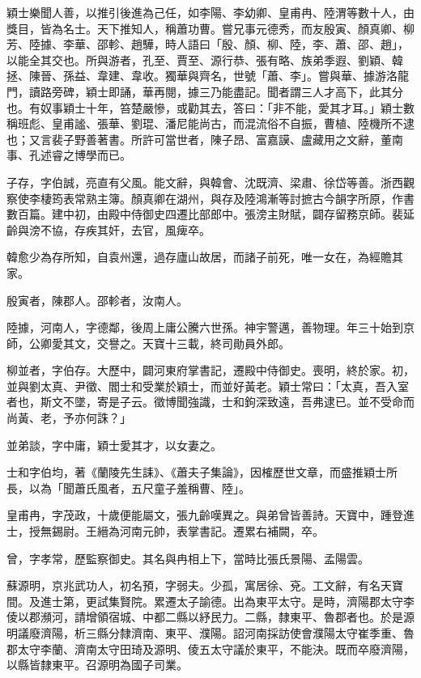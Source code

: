 \begin{pinyinscope}
 穎士樂聞人善，以推引後進為己任，如李陽、李幼卿、皇甫冉、陸渭等數十人，由獎目，皆為名士。天下推知人，稱蕭功曹。嘗兄事元德秀，而友殷寅、顏真卿、柳芳、陸據、李華、邵軫、趙驊，時人語曰「殷、顏、柳、陸，李、蕭、邵、趙」，以能全其交也。所與游者，孔至、賈至、源行恭、張有略、族弟季遐、劉穎、韓拯、陳晉、孫益、韋建、韋收。獨華與齊名，世號「蕭、李」。嘗與華、據游洛龍門，讀路旁碑，穎士即誦，華再閱，據三乃能盡記。聞者謂三人才高下，此其分也。有奴事穎士十年，笞楚嚴慘，或勸其去，答曰：「非不能，愛其才耳。」穎士數稱班彪、皇甫謐、張華、劉琨、潘尼能尚古，而混流俗不自振，曹植、陸機所不逮也；又言裴子野善著書。所許可當世者，陳子昂、富嘉謨、盧藏用之文辭，董南事、孔述睿之博學而已。



 子存，字伯誠，亮直有父風。能文辭，與韓會、沈既濟、梁肅、徐岱等善。浙西觀察使李棲筠表常熟主簿。顏真卿在湖州，與存及陸鴻漸等討摭古今韻字所原，作書數百篇。建中初，由殿中侍御史四遷比部郎中。張滂主財賦，闢存留務京師。裴延齡與滂不協，存疾其奸，去官，風痺卒。



 韓愈少為存所知，自袁州還，過存廬山故居，而諸子前死，唯一女在，為經贍其家。



 殷寅者，陳郡人。邵軫者，汝南人。



 陸據，河南人，字德鄰，後周上庸公騰六世孫。神宇警邁，善物理。年三十始到京師，公卿愛其文，交譽之。天寶十三載，終司勛員外郎。



 柳並者，字伯存。大歷中，闢河東府掌書記，遷殿中侍御史。喪明，終於家。初，並與劉太真、尹徵、閻士和受業於穎士，而並好黃老。穎士常曰：「太真，吾入室者也，斯文不墜，寄是子云。徵博聞強識，士和鉤深致遠，吾弗逮已。並不受命而尚黃、老，予亦何誅？」



 並弟談，字中庸，穎士愛其才，以女妻之。



 士和字伯均，著《蘭陵先生誄》、《蕭夫子集論》，因榷歷世文章，而盛推穎士所長，以為「聞蕭氏風者，五尺童子羞稱曹、陸」。



 皇甫冉，字茂政，十歲便能屬文，張九齡嘆異之。與弟曾皆善詩。天寶中，踵登進士，授無錫尉。王縉為河南元帥，表掌書記。遷累右補闕，卒。



 曾，字孝常，歷監察御史。其名與冉相上下，當時比張氏景陽、孟陽雲。



 蘇源明，京兆武功人，初名預，字弱夫。少孤，寓居徐、兗。工文辭，有名天寶間。及進士第，更試集賢院。累遷太子諭德。出為東平太守。是時，濟陽郡太守李倰以郡瀕河，請增領宿城、中都二縣以紓民力。二縣，隸東平、魯郡者也。於是源明議廢濟陽，析三縣分隸濟南、東平、濮陽。詔河南採訪使會濮陽太守崔季重、魯郡太守李蘭、濟南太守田琦及源明、倰五太守議於東平，不能決。既而卒廢濟陽，以縣皆隸東平。召源明為國子司業。




\end{pinyinscope}
